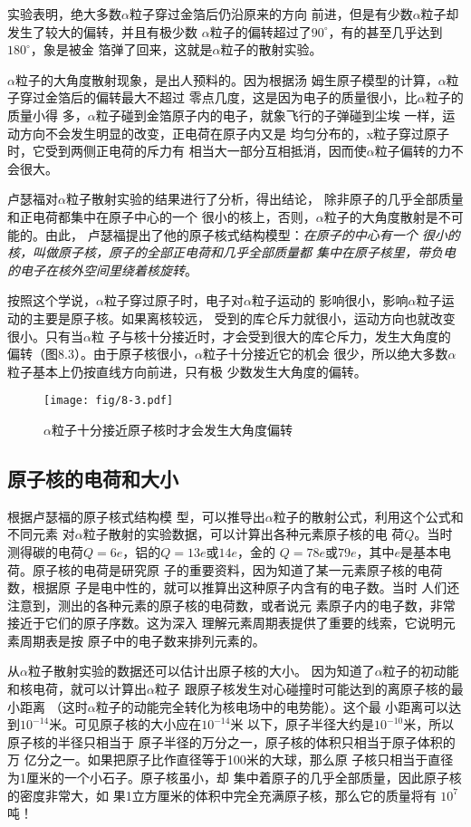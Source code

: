 实验表明，绝大多数$\alpha$粒子穿过金箔后仍沿原来的方向
前进，但是有少数$\alpha$粒子却发生了较大的偏转，并且有极少数
$\alpha$粒子的偏转超过了$90^{\circ}$，有的甚至几乎达到$180^{\circ}$，象是被金
箔弹了回来，这就是$\alpha$粒子的散射实验。

$\alpha$粒子的大角度散射现象，是出人预料的。因为根据汤
姆生原子模型的计算，$\alpha$粒子穿过金箔后的偏转最大不超过
零点几度，这是因为电子的质量很小，比$\alpha$粒子的质量小得
多，$\alpha$粒子碰到金箔原子内的电子，就象飞行的子弹碰到尘埃
一样，运动方向不会发生明显的改变，正电荷在原子内又是
均匀分布的，x粒子穿过原子时，它受到两侧正电荷的斥力有
相当大一部分互相抵消，因而使$\alpha$粒子偏转的力不会很大。

卢瑟福对$\alpha$粒子散射实验的结果进行了分析，得出结论，
除非原子的几乎全部质量和正电荷都集中在原子中心的一个
很小的核上，否则，$\alpha$粒子的大角度散射是不可能的。由此，
卢瑟福提出了他的原子核式结构模型：\textit{在原子的中心有一个
很小的核，叫做原子核，原子的全部正电荷和几乎全部质量都
集中在原子核里，带负电的电子在核外空间里绕着核旋转}。

按照这个学说，$\alpha$粒子穿过原子时，电子对$\alpha$粒子运动的
影响很小，影响$\alpha$粒子运动的主要是原子核。如果离核较远，
受到的库仑斥力就很小，运动方向也就改变很小。只有当$\alpha$粒
子与核十分接近时，才会受到很大的库仑斥力，发生大角度的
偏转（图8.3）。由于原子核很小，$\alpha$粒子十分接近它的机会
很少，所以绝大多数$\alpha$粒子基本上仍按直线方向前进，只有极
少数发生大角度的偏转。
\begin{figure}[htp]
    \centering
    \texttt{[image: fig/8-3.pdf]}
    \caption{$\alpha$粒子十分接近原子核时才会发生大角度偏转}
\end{figure}


\subsection{原子核的电荷和大小} 

根据卢瑟福的原子核式结构模
型，可以推导出$\alpha$粒子的散射公式，利用这个公式和不同元素
对$\alpha$粒子散射的实验数据，可以计算出各种元素原子核的电
荷$Q$。当时测得碳的电荷$Q=6e$，铝的$Q=13e$或$14e$，金的
$Q=78e$或$79e$，其中$e$是基本电荷。原子核的电荷是研究原
子的重要资料，因为知道了某一元素原子核的电荷数，根据原
子是电中性的，就可以推算出这种原子内含有的电子数。当时
人们还注意到，测出的各种元素的原子核的电荷数，或者说元
素原子内的电子数，非常接近于它们的原子序数。这为深入
理解元素周期表提供了重要的线索，它说明元素周期表是按
原子中的电子数来排列元素的。

从$\alpha$粒子散射实验的数据还可以估计出原子核的大小。
因为知道了$\alpha$粒子的初动能和核电荷，就可以计算出$\alpha$粒子
跟原子核发生对心碰撞时可能达到的离原子核的最小距离
（这时$\alpha$粒子的动能完全转化为核电场中的电势能）。这个最
小距离可以达到$10^{-14}$米。可见原子核的大小应在$10^{-14}$米
以下，原子半径大约是$10^{-10}$米，所以原子核的半径只相当于
原子半径的万分之一，原子核的体积只相当于原子体积的万
亿分之一。如果把原子比作直径等于100米的大球，那么原
子核只相当于直径为1厘米的一个小石子。原子核虽小，却
集中着原子的几乎全部质量，因此原子核的密度非常大，如
果1立方厘米的体积中完全充满原子核，那么它的质量将有
$10^7$吨！

